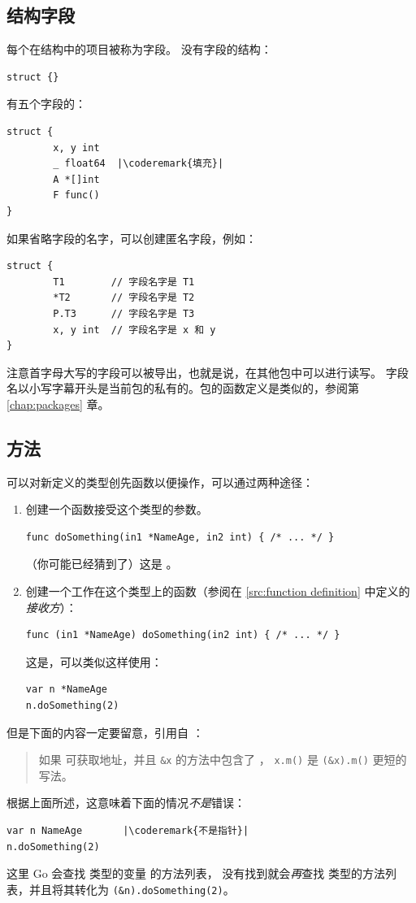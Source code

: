 \subsection{结构字段}
每个在结构中的项目被称为字段。
没有字段的结构：
\begin{lstlisting}
struct {}
\end{lstlisting}
有五个字段的：
\begin{lstlisting}
struct {
        x, y int
        _ float64  |\coderemark{填充}|
        A *[]int
        F func()
}
\end{lstlisting}
如果省略字段的名字，可以创建匿名字段，例如：
\begin{lstlisting}
struct {
        T1        // 字段名字是 T1
        *T2       // 字段名字是 T2
        P.T3      // 字段名字是 T3
        x, y int  // 字段名字是 x 和 y
}
\end{lstlisting}
注意首字母大写的字段可以被导出，也就是说，在其他包中可以进行读写。
字段名以小写字幕开头是当前包的私有的。包的函数定义是类似的，参阅第 \ref{chap:packages} 章。

\subsection{方法}
\label{sec:methods}
可以对新定义的类型创先函数以便操作，可以通过两种途径：
\begin{enumerate}
\item 创建一个函数接受这个类型的参数。
\begin{lstlisting}
func doSomething(in1 *NameAge, in2 int) { /* ... */ }
\end{lstlisting}
（你可能已经猜到了）这是 。
\item 创建一个工作在这个类型上的函数（参阅在 \ref{src:function definition}
中定义的\emph{接收方}）：
\begin{lstlisting}
func (in1 *NameAge) doSomething(in2 int) { /* ... */ }
\end{lstlisting}
这是，可以类似这样使用：
\begin{lstlisting}
var n *NameAge
n.doSomething(2)
\end{lstlisting}
\end{enumerate}
但是下面的内容一定要留意，引用自 \cite{go_spec}：
\begin{quote}
如果  可获取地址，并且 \lstinline{&x} 的方法中包含了 ，
\lstinline{x.m()} 是 \lstinline{(&x).m()} 更短的写法。
\end{quote}
根据上面所述，这意味着下面的情况\emph{不是}错误：
\begin{lstlisting}
var n NameAge	    |\coderemark{不是指针}|
n.doSomething(2)    
\end{lstlisting}
这里 Go 会查找  类型的变量  的方法列表，
没有找到就会\emph{再}查找  类型的方法列表，并且将其转化为
\lstinline{(&n).doSomething(2)}。

